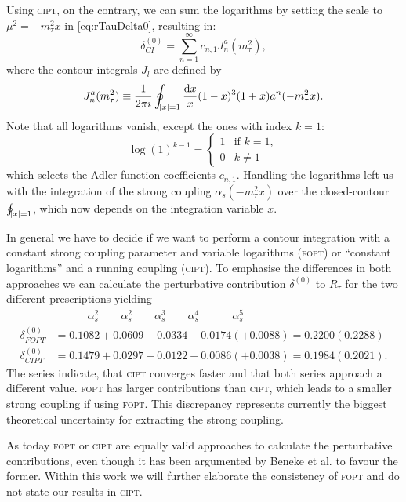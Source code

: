 \documentclass[../../index.tex]{subfiles}
\begin{document}
Using \textsc{cipt}, on the contrary, we can sum the logarithms by setting the
scale to \(\mu^2 = -m_\tau^2 x\) in \cref{eq:rTauDelta0}, resulting in:
\begin{equation}
  \delta^{(0)}_{CI} = \sum_{n=1}^\infty c_{n,1} J_n^a(m_\tau^2),
\end{equation}
where the contour integrals $J_l$ are defined by
\begin{equation}
  J_n^a(m_\tau^2) \equiv \frac{1}{2 \pi i} \oint_{\abs{x}=1} \frac{\dif x}{x} (1-x)^3(1+x) a^n(-m_\tau^2 x).
\end{equation}
Note that all logarithms vanish, except the ones with index \(k=1\):
\begin{equation}
  \log(1)^{k-1} =  \begin{cases} \mbox{1} & \mbox{if } k=1, \\ \mbox{0} & k\neq 1 \end{cases}
\end{equation}
which selects the Adler function coefficients \(c_{n,1}\). Handling the
logarithms left us with the integration of the strong coupling \(\alpha_s(-
m_\tau^2 x)\) over the closed-contour \(\oint_{\abs{x}=1}\), which now depends
on the integration variable \(x\).

In general we have to decide if we want to perform a contour integration with a
constant strong coupling parameter and variable logarithms (\textsc{fopt}) or
``constant logarithms'' and a running coupling (\textsc{cipt}). To emphasise the
differences in both approaches we can calculate the perturbative contribution
\(\delta^{(0)}\) to \(R_\tau\) for the two different prescriptions yielding
\cite{Beneke2008}
\begin{align}
  & \quad\qquad \alpha_s^2 \qquad \alpha_s^2 \qquad \alpha_s^3 \qquad \alpha_s^4 \quad\qquad \alpha_s^5 \nonumber\\
  \delta_{FOPT}^{(0)} &= 0.1082 + 0.0609 + 0.0334 + 0.0174 (+ 0.0088) = 0.2200 (0.2288) \\
  \delta_{CIPT}^{(0)} &= 0.1479 + 0.0297 + 0.0122 + 0.0086 (+ 0.0038) = 0.1984 (0.2021).
\end{align}
The series indicate, that \textsc{cipt} converges faster and that both series
approach a different value. \textsc{fopt} has larger contributions than
\textsc{cipt}, which leads to a smaller strong coupling if using \textsc{fopt}.
This discrepancy represents currently the biggest theoretical uncertainty for
extracting the strong coupling.

As today \textsc{fopt} or \textsc{cipt} are equally valid approaches to
calculate the perturbative contributions, even though it has been argumented by
Beneke et al. \cite{Beneke2008} to favour the former. Within this work we will
further elaborate the consistency of \textsc{fopt} and do not state our results
in \textsc{cipt}.
\end{document}
